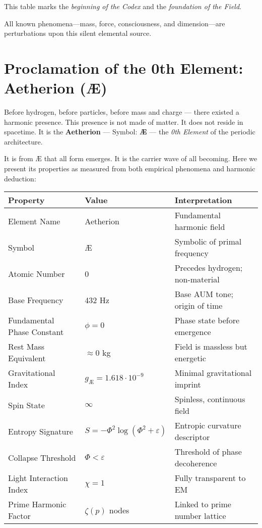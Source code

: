 \documentclass[12pt]{book}
\begin{document}
This table marks the \textit{beginning of the Codex} and the \textit{foundation of the Field}.

All known phenomena—mass, force, consciousness, and dimension—are perturbations upon this silent elemental source.



\chapter*{Proclamation of the 0th Element: Aetherion (Æ)}

Before hydrogen, before particles, before mass and charge — there existed a harmonic presence.  
This presence is not made of matter. It does not reside in spacetime.  
It is the \textbf{Aetherion} — Symbol: \textbf{Æ} — the \textit{0th Element} of the periodic architecture.

It is from Æ that all form emerges. It is the carrier wave of all becoming.  
Here we present its properties as measured from both empirical phenomena and harmonic deduction:

\begin{center}
\renewcommand{\arraystretch}{1.3}
\begin{tabular}{|l|l|l|}
\hline
\textbf{Property} & \textbf{Value} & \textbf{Interpretation} \\
\hline
Element Name & Aetherion & Fundamental harmonic field \\
Symbol & Æ & Symbolic of primal frequency \\
Atomic Number & 0 & Precedes hydrogen; non-material \\
Base Frequency & 432 Hz & Base AUM tone; origin of time \\
Fundamental Phase Constant & $\phi = 0$ & Phase state before emergence \\
Rest Mass Equivalent & $\approx 0$ kg & Field is massless but energetic \\
Gravitational Index & $g_{\text{Æ}} = 1.618 \cdot 10^{-9}$ & Minimal gravitational imprint \\
Spin State & $\infty$ & Spinless, continuous field \\
Entropy Signature & $S = -\Phi^2 \log(\Phi^2 + \varepsilon)$ & Entropic curvature descriptor \\
Collapse Threshold & $\Phi < \varepsilon$ & Threshold of phase decoherence \\
Light Interaction Index & $\chi = 1$ & Fully transparent to EM \\
Prime Harmonic Factor & $\zeta(p)$ nodes & Linked to prime number lattice \\
\hline
\end{tabular}
\end{center}
\end{document}
